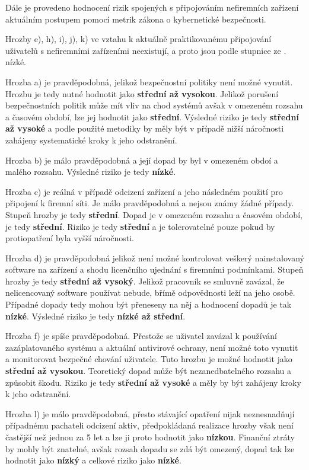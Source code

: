 Dále je provedeno hodnocení rizik spojených s připojováním nefiremních zařízení aktuálním postupem pomocí metrik zákona o kybernetické bezpečnosti.

Hrozby e), h), i), j), k) ve vztahu k aktuálně praktikovanému připojování uživatelů s nefiremními zařízeními neexistují, a proto jsou podle stupnice ze . nízké.

Hrozba a) je pravděpodobná, jelikož bezpečnostní politiky není možné vynutit. Hrozbu je tedy nutné hodnotit jako \textbf{střední až vysokou}. Jelikož porušení bezpečnostních politik může mít vliv na chod systémů avšak v omezeném rozsahu a časovém období, lze jej hodnotit jako \textbf{střední}. Výsledné riziko je tedy \textbf{střední až vysoké} a podle použité metodiky by měly být v případě nižší náročnosti zahájeny systematické kroky k jeho odstranění.

Hrozba b) je málo pravděpodobná a její dopad by byl v omezeném obdoí a malého rozsahu. Výsledné riziko je tedy \textbf{nízké}.

Hrozba c) je reálná v případě odcizení zařízení a jeho následném použití pro připojení k firemní síti. Je málo pravděpodobná a nejsou známy žádné případy. Stupeň hrozby je tedy \textbf{střední}. Dopad je v omezeném rozsahu a časovém období, je tedy \textbf{střední}. Riziko je tedy \textbf{střední} a je tolerovatelné pouze pokud by protiopatření byla vyšší náročnosti.

Hrozba d) je pravděpodobná jelikož není možné kontrolovat veškerý nainstalovaný software na zařízení a shodu licenčního ujednání s firemními podmínkami. Stupeň hrozby je tedy \textbf{střední až vysoký}. Jelikož pracovník se smluvně zavázal, že nelicencovaný software používat nebude, břímě odpovědnosti leží na jeho osobě. Případné dopady tedy mohou být přeneseny na něj a hodnocení dopadů je tak \textbf{nízké}. Výsledné riziko je tedy \textbf{nízké až střední}.

Hrozba f) je spíše pravděpodobná. Přestože se uživatel zavázal k používání zazáplatovaného systému a aktuální antivirové ochrany, není možné toto vynutit a monitorovat bezpečné chování uživatele. Tuto hrozbu je možné hodnotit jako \textbf{střední až vysokou}. Teoretický dopad může být nezanedbatelného rozsahu a způsobit škodu. Riziko je tedy \textbf{střední až vysoké} a měly by být zahájeny kroky k jeho odstranění.

Hrozba l) je málo pravděpodobná, přesto stávající opatření nijak neznesnadňují případnému pachateli odcizení aktiv, předpokládaná realizace hrozby však není častější než jednou za 5 let a lze ji proto hodnotit jako \textbf{nízkou}. Finanční ztráty by mohly být znatelné, avšak rozsah dopadu se zdá být omezený, dopad tak lze hodnotit jako \textbf{nízký} a celkové riziko jako \textbf{nízké}.

